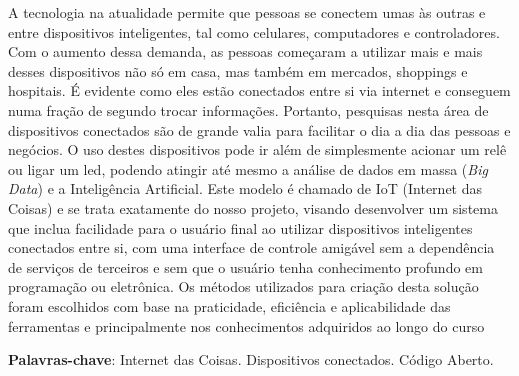 \documentclass[../../layout.tex]{subfiles}
\begin{document}
\begin{resumo}
\hspace*{3em}
A tecnologia na atualidade permite que pessoas se conectem umas às outras e entre dispositivos inteligentes, tal como celulares, computadores e controladores. Com o aumento dessa demanda, as pessoas começaram a utilizar mais e mais desses dispositivos não só em casa, mas também em mercados, shoppings e hospitais. É evidente como eles estão conectados entre si via internet e conseguem numa fração de segundo trocar informações. Portanto, pesquisas nesta área de dispositivos conectados são de grande valia para facilitar o dia a dia das pessoas e negócios. O uso destes dispositivos pode ir além de simplesmente acionar um relê ou ligar um led, podendo atingir até mesmo a análise de dados em massa (\emph{Big Data}) e a Inteligência Artificial. Este modelo  é chamado de IoT (Internet das Coisas) e se trata exatamente do nosso projeto, visando desenvolver um sistema que inclua facilidade para o usuário final ao utilizar dispositivos inteligentes conectados entre si, com uma interface de controle amigável sem a dependência de serviços de terceiros e sem que o usuário tenha conhecimento profundo em programação ou eletrônica. Os métodos utilizados para criação desta solução foram escolhidos com base na praticidade, eficiência e aplicabilidade das ferramentas e principalmente nos conhecimentos adquiridos ao longo do curso
\vspace{\onelineskip}

\noindent
\textbf{Palavras-chave}: Internet das Coisas. Dispositivos conectados. Código Aberto.
\end{resumo}
\end{document}
